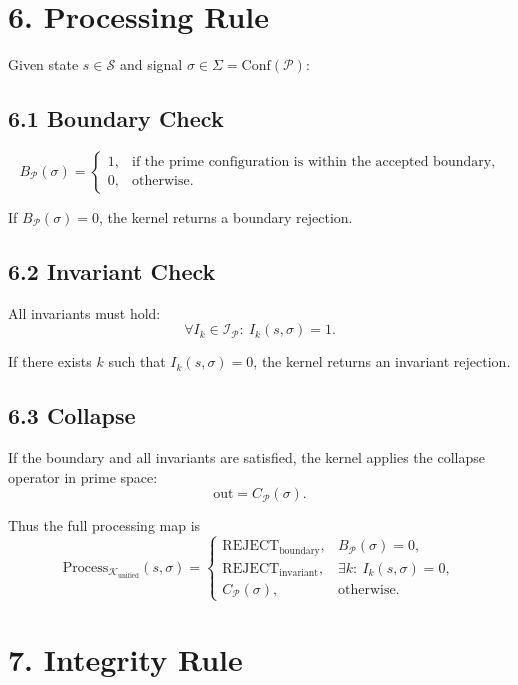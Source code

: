 \documentclass[12pt]{article}
\begin{document}
\section*{6. Processing Rule}

Given state \(s \in \mathcal{S}\) and signal \(\sigma \in \Sigma = \mathrm{Conf}(\mathcal{P})\):

\subsection*{6.1 Boundary Check}

\[
B_{\mathcal{P}}(\sigma) =
\begin{cases}
1, & \text{if the prime configuration is within the accepted boundary},\\
0, & \text{otherwise}.
\end{cases}
\]

If \(B_{\mathcal{P}}(\sigma) = 0\), the kernel returns a boundary rejection.

\subsection*{6.2 Invariant Check}

All invariants must hold:
\[
\forall I_k \in \mathcal{I}_{\mathcal{P}}:\ I_k(s,\sigma) = 1.
\]

If there exists \(k\) such that \(I_k(s,\sigma) = 0\), the kernel returns an invariant rejection.

\subsection*{6.3 Collapse}

If the boundary and all invariants are satisfied, the kernel applies the collapse operator in prime space:
\[
\text{out} = C_{\mathcal{P}}(\sigma).
\]

Thus the full processing map is
\[
\mathrm{Process}_{\mathcal{K}_{\text{unified}}}(s,\sigma) =
\begin{cases}
\mathrm{REJECT}_{\text{boundary}}, & B_{\mathcal{P}}(\sigma) = 0, \\[4pt]
\mathrm{REJECT}_{\text{invariant}}, & \exists k:\ I_k(s,\sigma) = 0, \\[4pt]
C_{\mathcal{P}}(\sigma), & \text{otherwise}.
\end{cases}
\]

\section*{7. Integrity Rule}
\end{document}

